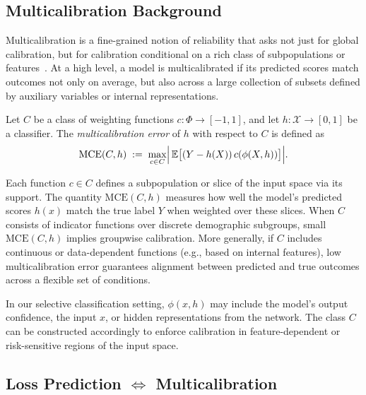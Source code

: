 \subsection{Multicalibration Background}

Multicalibration is a fine-grained notion of reliability that asks not just for global calibration, but for calibration conditional on a rich class of subpopulations or features~\citep{hebert2018multicalibration}. At a high level, a model is multicalibrated if its predicted scores match outcomes not only on average, but also across a large collection of subsets defined by auxiliary variables or internal representations.

\begin{definition}
\label{def:mce}
Let \(C\) be a class of weighting functions \(c\colon\Phi\to[-1,1]\), and let \(h\colon\mathcal{X} \to [0,1]\) be a classifier. The \emph{multicalibration error} of \(h\) with respect to \(C\) is defined as
\begin{equation}
\mathrm{MCE}(C,h)
\;:=\;
\max_{c\in C}
\Bigl|\,
\mathbb{E}\bigl[(Y - h(X))\,c(\phi(X,h))\bigr]
\Bigr|.
\end{equation}
\end{definition}

Each function \(c \in C\) defines a subpopulation or slice of the input space via its support. The quantity \(\mathrm{MCE}(C,h)\) measures how well the model's predicted scores \(h(x)\) match the true label \(Y\) when weighted over these slices. When \(C\) consists of indicator functions over discrete demographic subgroups, small \(\mathrm{MCE}(C,h)\) implies groupwise calibration. More generally, if \(C\) includes continuous or data-dependent functions (e.g., based on internal features), low multicalibration error guarantees alignment between predicted and true outcomes across a flexible set of conditions.

In our selective classification setting, \(\phi(x,h)\) may include the model’s output confidence, the input \(x\), or hidden representations from the network. The class \(C\) can be constructed accordingly to enforce calibration in feature-dependent or risk-sensitive regions of the input space.


\subsection{Loss Prediction \texorpdfstring{$\Longleftrightarrow$}{<=>} Multicalibration}

